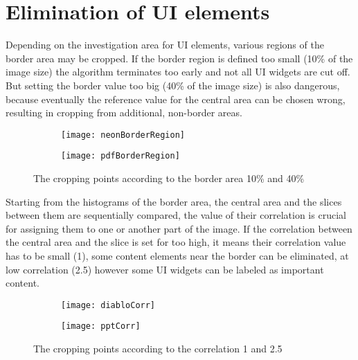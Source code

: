 \documentclass[draft,final]{vutinfth} %
\begin{document}
	\section{Elimination of UI elements} 
	Depending on the investigation area for UI elements, various regions of the border area may be cropped. 
	If the border region is defined too small (10\% of the image size) the algorithm terminates too early and not all UI widgets are cut off.
	But setting the border value too big (40\% of the image size) is also dangerous, because eventually the reference value for the central area can be chosen wrong, resulting in cropping from additional, non-border areas.\par
	\begin{figure}[H]
		\centering
		\begin{subfigure}[b]{0.45\columnwidth}
			\centering
			\texttt{[image: neonBorderRegion]}
			\label{fig:res:neon}
		\end{subfigure}
		\begin{subfigure}[b]{0.45\columnwidth}
			\centering
			\texttt{[image: pdfBorderRegion]}
			\label{fig:res:pdf}
		\end{subfigure}
		\caption{The cropping points according to the border area 10\% and 40\%}
	\end{figure} 
	Starting from the histograms of the border area, the central area and the slices between them are sequentially compared, the value of their correlation is crucial for assigning them to one or another part of the image.
	If the correlation between the central area and the slice is set for too high, it means their correlation value has to be small (1), some content elements near the border can be eliminated, at low correlation (2.5) however some UI widgets can be labeled as important content. \par
	\begin{figure}[H]
		\centering
		\begin{subfigure}[b]{0.45\columnwidth}
			\centering
			\texttt{[image: diabloCorr]}
			\label{fig:res:corr1}
		\end{subfigure}
		\begin{subfigure}[b]{0.45\columnwidth}
			\centering
			\texttt{[image: pptCorr]}
			\label{fig:res:corr2}
		\end{subfigure}
		\caption{The cropping points according to the correlation 1 and 2.5}
	\end{figure} 
\end{document}
